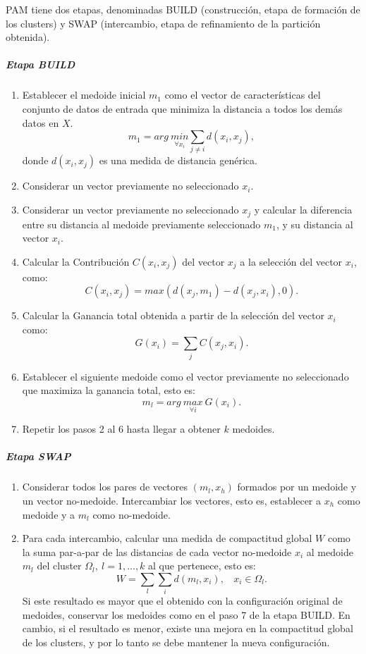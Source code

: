 \bigskip PAM tiene dos etapas, denominadas BUILD (construcción, etapa de formación de los clusters) y SWAP (intercambio, etapa de refinamiento de la partición obtenida).
\subparagraph{Etapa BUILD}
\begin{enumerate}
	\item Establecer el medoide inicial \(m_1\) como el vector de características del conjunto de datos de entrada que minimiza la distancia a todos los demás datos en \(X\).
\[m_1 = arg \> \underset{\forall x_i}{min} \sum_{j \neq i}d(x_i,x_j),\]
donde \(d(x_i,x_j)\) es una medida de distancia genérica.
	\item Considerar un vector previamente no seleccionado \(x_i\).
	\item Considerar un vector previamente no seleccionado \(x_j\) y calcular la diferencia entre su distancia al medoide previamente seleccionado \(m_1\), y su distancia al vector \(x_i\).
	\item Calcular la Contribución \(C(x_i,x_j)\) del vector \(x_j\) a la selección del vector \(x_i\), como:
\[C(x_i, x_j) = max(d(x_j, m_1) - d(x_j, x_i), 0).\]
	\item Calcular la Ganancia total obtenida a partir de la selección del vector \(x_i\) como:
\[G(x_i) = \sum_{j} C(x_j, x_i).\]
	\item Establecer el siguiente medoide como el vector previamente no seleccionado que maximiza la ganancia total, esto es:
\[m_l = arg \> \underset{\forall i}{max} \> G(x_i).\]
	\item Repetir los pasos 2 al 6 hasta llegar a obtener \(k\) medoides.
\end{enumerate}

\subparagraph{Etapa SWAP}
\begin{enumerate}
	\item Considerar todos los pares de vectores \((m_l,x_h)\) formados por un medoide y un vector no-medoide. Intercambiar los vectores, esto es, establecer a \(x_h\) como medoide y a \(m_l\) como no-medoide.
	\item Para cada intercambio, calcular una medida de compactitud global \(W\) como la suma par-a-par de las distancias de cada vector no-medoide \(x_i\) al medoide \(m_l\) del cluster \(\Omega_l,\: l = 1,...,k\) al que pertenece, esto es:
	\[W = \sum_{l} \sum_{i} d(m_l, x_i), \:\:\:\: x_i \in \Omega_l.\]
	Si este resultado es mayor que el obtenido con la configuración original de medoides, conservar los medoides como en el paso 7 de la etapa BUILD. En cambio, si el resultado es menor, existe una mejora en la compactitud global de los clusters, y por lo tanto se debe mantener la nueva configuración.
\end{enumerate}

